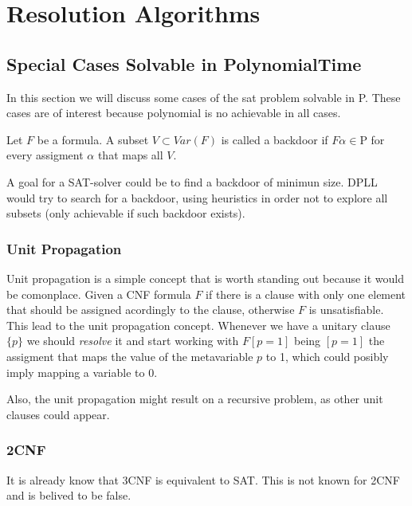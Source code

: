 
\chapter{Resolution Algorithms}

\section{Special Cases Solvable in PolynomialTime}

In this section we will discuss some cases of the sat problem solvable in P. These cases are of interest because polynomial is no achievable in all cases.

\begin{definition}
  Let $F$ be a formula. A subset $ V \subset Var(F)$ is called a backdoor if $F\alpha \in \text{P}$ for every assigment $\alpha$ that maps all $V$.
\end{definition}
A goal for a SAT-solver could be to find a backdoor of minimun size. DPLL would try to search for a backdoor, using heuristics in order not to explore all subsets (only achievable if such backdoor exists).
\subsection{Unit Propagation}

Unit propagation is a simple concept that is worth standing out because it would be comonplace. Given a CNF formula $F$ if there is a clause with only one element that should be assigned acordingly to the clause, otherwise $F$ is unsatisfiable. This lead to the unit propagation concept. Whenever we have a unitary clause $\{p\}$ we should \emph{resolve} it and start working with $F[p=1]$ being $[p=1]$ the assigment that maps the value of the metavariable $p$ to 1, which could posibly imply mapping a variable to $0$.

Also, the unit propagation might result on a recursive problem, as other unit clauses could appear.

\subsection{2CNF}
It is already know that 3CNF is equivalent to SAT. This is not known for 2CNF and is belived to be false.

